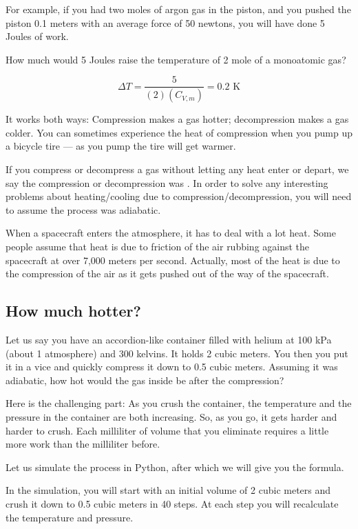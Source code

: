 For example, if you had two moles of argon gas in the piston, and you pushed the piston 0.1 meters with an average force of 50 newtons, you will have done 5 Joules of work.

How much would 5 Joules raise the temperature of 2 mole of a monoatomic gas? 

$$\Delta T = \frac{5}{(2)(C_{V,m})} = 0.2\text{ K}$$ 

It works both ways: Compression makes a gas hotter; decompression makes a gas colder. You can sometimes experience the heat of compression when you pump up a bicycle tire --- as you pump the tire will get warmer.

If you compress or decompress a gas without letting any heat enter or depart, we say the compression or decompression was . In order to solve any interesting problems about heating/cooling due to compression/decompression, you will need to assume the process was adiabatic.

When a spacecraft enters the atmosphere, it has to deal with a lot heat. Some people assume that heat is due to friction of the air rubbing against the 
spacecraft at over 7,000 meters per second. Actually, most of the heat is due to the compression of the air as it gets pushed out of the way of the spacecraft.

\subsection{How much hotter?}

Let us say you have an accordion-like container filled with helium at 100 kPa (about 1 atmosphere) and 300 kelvins. It holds 2 cubic meters. You then you put it in a vice and quickly compress it down to 0.5 cubic meters. Assuming it was adiabatic, how hot would the gas inside be after the compression?

Here is the challenging part: As you crush the container, the temperature and the pressure in the container are both increasing. So, as you go, it gets harder and harder to crush. Each milliliter of volume that you eliminate requires a little more work than the milliliter before.

Let us simulate the process in Python, after which we will give you the formula. 

In the simulation, you will start with an initial volume of 2 cubic meters and crush it down to 0.5 cubic meters in 40 steps. At each step you will recalculate the temperature and pressure.

